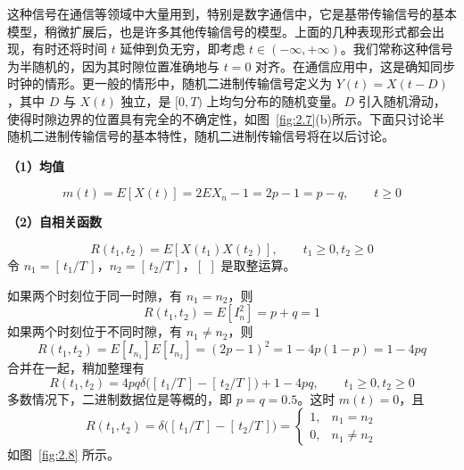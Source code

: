 \documentclass[11pt,openany,UTF8]{ctexbook}
\newcommand{\E}{E}                                 %
\newcommand{\bhead}[1]{\par\medskip\noindent\textbf{#1}\par\smallskip}
\begin{document}
这种信号在通信等领域中大量用到\nobreak，特别是数字通信中\nobreak，它是基带传输信号的基本模型\nobreak，稍微扩展后\nobreak，也是许多其他传输信号的模型\nobreak。上面的几种表现形式都会出现\nobreak，有时还将时间 $t$ 延伸到负无穷\nobreak，即考虑 $t\in(-\infty,+\infty)$\nobreak。我们常称这种信号为半随机的\nobreak，因为其时隙位置准确地与 $t=0$ 对齐\nobreak。在通信应用中\nobreak，这是确知同步时钟的情形\nobreak。更一般的情形中\nobreak，随机二进制传输信号定义为 $Y(t)=X(t-D)$\nobreak，其中 $D$ 与 $X(t)$ 独立\nobreak，是 $[0,T)$ 上均匀分布的随机变量\nobreak。$D$ 引入随机滑动\nobreak，使得时隙边界的位置具有完全的不确定性\nobreak，如图~\ref{fig:2.7}(b)所示\nobreak。下面只讨论半随机二进制传输信号的基本特性\nobreak，随机二进制传输信号将在以后讨论\nobreak。

\bhead{（1\nobreak）均值}
\begin{equation}
m(t)=\E[X(t)]=2\E X_n-1=2p-1=p-q,\qquad t\geqslant 0
\label{eq:2.11}
\end{equation}
\bhead{（2\nobreak）自相关函数}
\[
R(t_1,t_2)=\E[X(t_1)X(t_2)],\qquad t_1\geqslant 0,t_2\geqslant 0
\]
令 $n_1=[\,t_1/T\,]$\nobreak，$n_2=[\,t_2/T\,]$\nobreak，$[\,\ ]$ 是取整运算\nobreak。%

如果两个时刻位于同一时隙\nobreak，有 $n_1=n_2$\nobreak，则
\[
R(t_1,t_2)=\E[I_n^2]=p+q=1
\]
如果两个时刻位于不同时隙\nobreak，有 $n_1\neq n_2$\nobreak，则
\[
R(t_1,t_2)=\E[I_{n_1}]\E[I_{n_2}]=(2p-1)^2=1-4p(1-p)=1-4pq
\]
合并在一起\nobreak，稍加整理有
\begin{equation}
R(t_1,t_2)=4pq\delta\bigl([\,t_1/T\,]-[\,t_2/T\,]\bigr)+1-4pq,\qquad t_1\geqslant 0,t_2\geqslant 0
\label{eq:2.12}
\end{equation}
多数情况下\nobreak，二进制数据位是等概的\nobreak，即 $p=q=0.5$\nobreak。这时 $m(t)=0$\nobreak，且
\begin{equation}
R(t_1,t_2)=\delta\bigl([\,t_1/T\,]-[\,t_2/T\,]\bigr)=
\begin{cases}
1,& n_1=n_2\\
0,& n_1\neq n_2
\end{cases}
\label{eq:2.13}
\end{equation}
如图~\ref{fig:2.8} 所示\nobreak。
\end{document}
